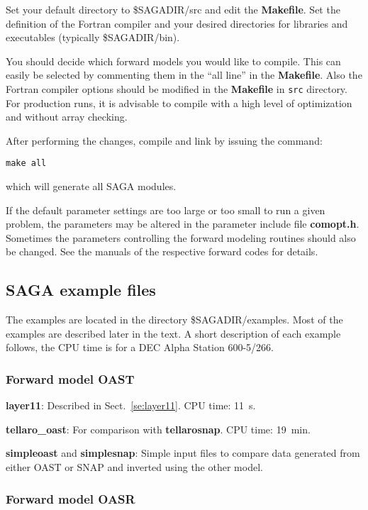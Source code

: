 \documentclass{saclantc}
\begin{document}
Set your default directory to \$SAGADIR/src and edit the {\bf
Makefile}. Set the definition of the Fortran compiler and your desired
directories for libraries and executables (typically \$SAGADIR/bin).

You should decide which forward models you would like to compile. This can
easily be selected by commenting them  in the ``all line'' in the {\bf
Makefile}.
Also the Fortran compiler options should be modified in the {\bf
Makefile} in {\tt src} directory. For production runs, it is
advisable to compile with a high level of optimization and without
array checking.

\noindent    After  performing  the changes, compile and link  by issuing the 
command:

    {\tt make all}

\noindent which will generate all {\sf SAGA} modules.

    If  the default parameter settings are too large or too small to run
a given problem, the parameters  may 
be  altered in the parameter include file {\bf comopt.h}. Sometimes
the parameters
controlling the forward modeling routines should also be
changed. See the 
manuals of the respective forward codes for details. 


\subsection{SAGA example files}

\vspace*{-1.0mm}
The examples are located in the directory
\$SAGADIR/examples. Most of the examples are described later in the text.
A short description of each example follows, the CPU time is for  a
DEC Alpha Station 600-5/266.

\subsubsection{Forward model OAST}

\vspace*{-1.0mm}\noindent
{\bf layer11}: Described in Sect.~\ref{se:layer11}. CPU time: 11~s.

{\bf tellaro\_oast}: For comparison with {\bf tellarosnap}. CPU time: 19~min.
\noindent

{\bf simpleoast} and {\bf simplesnap}: Simple input files to compare
data generated from either {\sf OAST} or {\sf SNAP} and inverted using the 
other model. 
\subsubsection{Forward model OASR}
\end{document}

